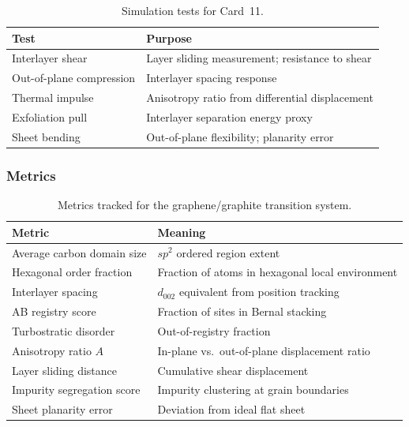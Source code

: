 \documentclass[12pt]{article}
\begin{document}
\begin{table}[H]
\centering
\caption{Simulation tests for Card~11.}
\label{tab:graphene_tests}
\begin{tabular}{ll}
\toprule
\textbf{Test} & \textbf{Purpose} \\
\midrule
Interlayer shear              & Layer sliding measurement; resistance to shear \\
Out-of-plane compression      & Interlayer spacing response \\
Thermal impulse               & Anisotropy ratio from differential displacement \\
Exfoliation pull              & Interlayer separation energy proxy \\
Sheet bending                 & Out-of-plane flexibility; planarity error \\
\bottomrule
\end{tabular}
\end{table}

\subsubsection*{Metrics}

\begin{table}[H]
\centering
\caption{Metrics tracked for the graphene/graphite transition system.}
\label{tab:graphene_metrics}
\begin{tabular}{ll}
\toprule
\textbf{Metric} & \textbf{Meaning} \\
\midrule
Average carbon domain size       & $sp^2$ ordered region extent \\
Hexagonal order fraction         & Fraction of atoms in hexagonal local environment \\
Interlayer spacing               & $d_{002}$ equivalent from position tracking \\
AB registry score                & Fraction of sites in Bernal stacking \\
Turbostratic disorder            & Out-of-registry fraction \\
Anisotropy ratio $A$             & In-plane vs.\ out-of-plane displacement ratio \\
Layer sliding distance           & Cumulative shear displacement \\
Impurity segregation score       & Impurity clustering at grain boundaries \\
Sheet planarity error            & Deviation from ideal flat sheet \\
\bottomrule
\end{tabular}
\end{table}
\end{document}
